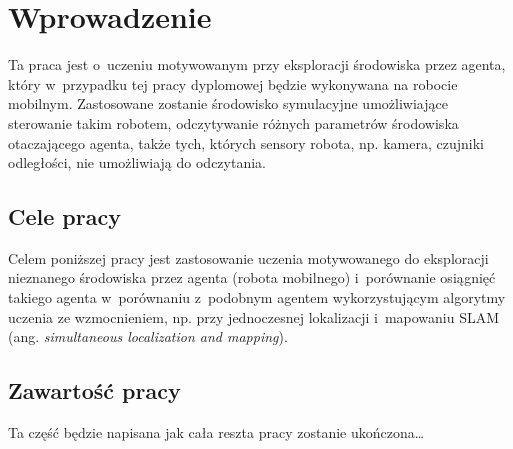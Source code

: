 \chapter{Wprowadzenie}
\label{cha:wprowadzenie}

Ta praca jest o~uczeniu motywowanym przy eksploracji środowiska przez agenta, 
który w~przypadku tej pracy dyplomowej będzie wykonywana na robocie mobilnym. 
Zastosowane zostanie środowisko symulacyjne umożliwiające sterowanie takim 
robotem, odczytywanie różnych parametrów środowiska otaczającego agenta, 
także tych, których sensory robota, np. kamera, czujniki odległości, nie 
umożliwiają do odczytania.


\section{Cele pracy}
\label{sec:cele_pracy}

Celem poniższej pracy jest zastosowanie uczenia motywowanego do eksploracji 
nieznanego środowiska przez agenta (robota mobilnego) i~porównanie osiągnięć 
takiego agenta w~porównaniu z~podobnym agentem wykorzystującym algorytmy uczenia 
ze wzmocnieniem, np. przy jednoczesnej lokalizacji i~mapowaniu SLAM (ang. 
\textit{simultaneous localization and mapping}).


\section{Zawartość pracy}
\label{sec:zawartosc_pracy}

Ta część będzie napisana jak cała reszta pracy zostanie ukończona\dots
